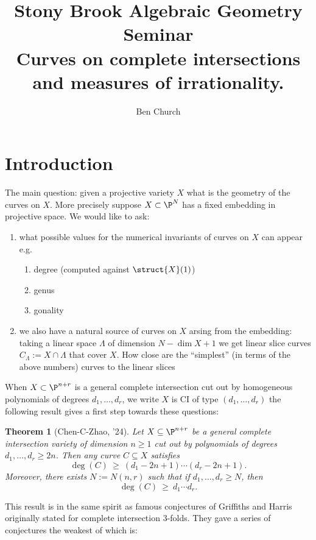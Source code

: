 \documentclass[12pt]{article}
\theoremstyle{plain}
\newtheorem{Lthm}{Theorem}
\begin{document}
\title{Stony Brook Algebraic Geometry Seminar \\ \large Curves on complete intersections and measures of irrationality.}
\author{Ben Church}
\maketitle
\tableofcontents


\section{Introduction}

The main question: given a projective variety $X$ what is the geometry of the curves on $X$. More precisely suppose $X \subset \P^N$ has a fixed embedding in projective space. We would like to ask:
\begin{enumerate}
\item what possible values for the numerical invariants of curves on $X$ can appear e.g.
\begin{enumerate}
\item degree (computed against $\struct{X}(1)$)
\item genus 
\item gonality
\end{enumerate}
\item we also have a natural source of curves on $X$ arsing from the embedding: taking a linear space $\Lambda$ of dimension $N - \dim{X}+1$ we get linear slice curves $C_\Lambda := X \cap \Lambda$ that cover $X$. {\color{red} How close are the ``simplest'' (in terms of the above numbers) curves to the linear slices}
\end{enumerate}
When $X \subset \P^{n+r}$ is a general complete intersection cut out by homogeneous polynomials of degrees $d_1, \dots, d_r$, we write $X$ is CI of type $(d_1, \dots, d_r)$ the following result gives a first step towards these questions:

\begin{Lthm}[Chen-C-Zhao, '24]
Let $X \subseteq \P^{n+r}$ be a general complete intersection variety of dimension $n \geq 1$ cut out by polynomials of degrees $d_{1}, \ldots, d_{r} \geq 2n$. Then any curve $C \subseteq X$ satisfies
\[ \deg(C)\ \ge\ (d_1 - 2n + 1) \cdots (d_r - 2n + 1) .\]
Moreover, there exists $N := N(n,r)$ such that if $d_1, \dots, d_r \ge N$, then
\[ \deg(C)\ \ge\ d_1 \cdots d_r. \]
\end{Lthm}

This result is in the same spirit as famous conjectures of Griffiths and Harris originally stated for complete intersection 3-folds. They gave a series of conjectures the weakest of which is:
\end{document}
